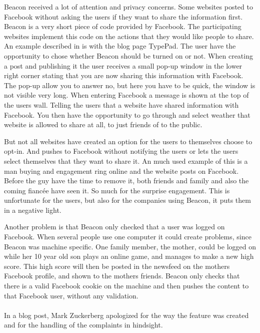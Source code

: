 Beacon received a lot of attention and privacy concerns. Some websites posted to Facebook without asking the users if they want to share the information first. Beacon is a very short piece of code provided by Facebook. The participating websites implement this code on the actions that they would like people to share. An example described in \cite{beaconMarketsPerspective} is with the blog page TypePad. The user have the opportunity to chose whether Beacon should be turned on or not. When creating a post and publishing it the user receives a small pop-up window in the lower right corner stating that you are now sharing this information with Facebook. The pop-up allow you to answer no, but here you have to be quick, the window is not visible very long. When entering Facebook a message is shown at the top of the users wall. Telling the users that a website have shared information with Facebook. You then have the opportunity to go through and select weather that website is allowed to share at all, to just friends of to the public.  

But not all websites have created an option for the users to themselves choose to opt-in. And pushes to Facebook without notifying the users or lets the users select themselves that they want to share it. An much used example of this is a man buying and engagement ring online and the website posts on Facebook. Before the guy have the time to remove it, both friends and family and also the coming fiancée have seen it. So much for the surprise engagement.  
This is unfortunate for the users, but also for the companies using Beacon, it puts them in a negative light. 

Another problem is that Beacon only checked that a user was logged on Facebook. When several people use one computer it could create problems, since Beacon was machine specific. One family member, the mother, could be logged on while her 10 year old son plays an online game, and manages to make a new high score. This high score will then be posted in the newsfeed on the mothers Facebook profile, and shown to the mothers friends.  Beacon only checks that there is a valid Facebook cookie on the machine and then pushes the content to that Facebook user, without any validation. 

\paragraph{}
In a blog post, Mark Zuckerberg apologized for the way the feature was created and for the handling of the complaints in hindsight. 
\cite{Beacon} 

